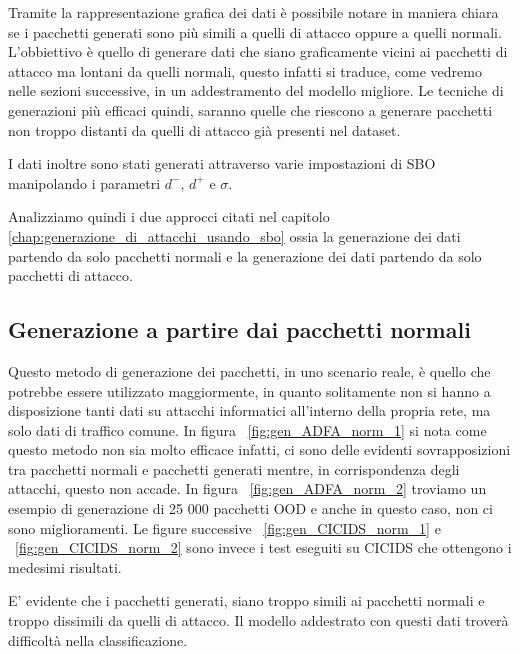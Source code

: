 Tramite la rappresentazione grafica dei dati è possibile notare in maniera chiara se i pacchetti generati sono più simili a quelli di attacco oppure a quelli normali. L'obbiettivo è quello di generare dati che siano graficamente vicini ai pacchetti di attacco ma lontani da quelli normali, questo infatti si traduce, come vedremo nelle sezioni successive, in un addestramento del modello migliore. Le tecniche di generazioni più efficaci quindi, saranno quelle che riescono a generare pacchetti non troppo distanti da quelli di attacco già presenti nel dataset.

I dati inoltre sono stati generati attraverso varie impostazioni di SBO manipolando i parametri $d^{-}$, $d^{+}$ e $\sigma$.

Analizziamo quindi i due approcci citati nel capitolo \ref{chap:generazione_di_attacchi_usando_sbo} ossia la generazione dei dati partendo da solo pacchetti normali e la generazione dei dati partendo da solo pacchetti di attacco.

\subsection{Generazione a partire dai pacchetti normali}

Questo metodo di generazione dei pacchetti, in uno scenario reale, è quello che potrebbe essere utilizzato maggiormente, in quanto solitamente non si hanno a disposizione tanti dati su attacchi informatici all'interno della propria rete, ma solo dati di traffico comune. In figura ~\ref{fig:gen_ADFA_norm_1} si nota come questo metodo non sia molto efficace infatti, ci sono delle evidenti sovrapposizioni tra pacchetti normali e pacchetti generati mentre, in corrispondenza degli attacchi, questo non accade. In figura ~\ref{fig:gen_ADFA_norm_2} troviamo un esempio di generazione di 25 000 pacchetti OOD e anche in questo caso, non ci sono miglioramenti. Le figure successive ~\ref{fig:gen_CICIDS_norm_1} e ~\ref{fig:gen_CICIDS_norm_2} sono invece i test eseguiti su CICIDS che ottengono i medesimi risultati.

E' evidente che i pacchetti generati, siano troppo simili ai pacchetti normali e troppo dissimili da quelli di attacco. Il modello addestrato con questi dati troverà difficoltà nella classificazione.

